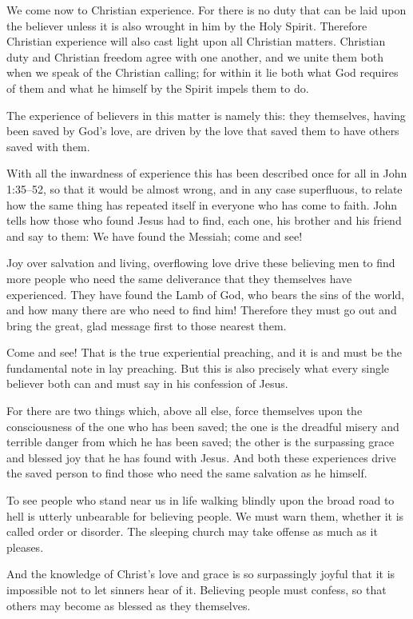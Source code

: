 We come now to Christian experience. For there is no duty that can be laid upon the believer unless it is also wrought in him by the Holy Spirit. Therefore Christian experience will also cast light upon all Christian matters. Christian duty and Christian freedom agree with one another, and we unite them both when we speak of the Christian calling; for within it lie both what God requires of them and what he himself by the Spirit impels them to do.

The experience of believers in this matter is namely this: they themselves, having been saved by God’s love, are driven by the love that saved them to have others saved with them.

With all the inwardness of experience this has been described once for all in John 1:35–52, so that it would be almost wrong, and in any case superfluous, to relate how the same thing has repeated itself in everyone who has come to faith. John tells how those who found Jesus had to find, each one, his brother and his friend and say to them: We have found the Messiah; come and see!

Joy over salvation and living, overflowing love drive these believing men to find more people who need the same deliverance that they themselves have experienced. They have found the Lamb of God, who bears the sins of the world, and how many there are who need to find him! Therefore they must go out and bring the great, glad message first to those nearest them.

Come and see! That is the true experiential preaching, and it is and must be the fundamental note in lay preaching. But this is also precisely what every single believer both can and must say in his confession of Jesus.

For there are two things which, above all else, force themselves upon the consciousness of the one who has been saved; the one is the dreadful misery and terrible danger from which he has been saved; the other is the surpassing grace and blessed joy that he has found with Jesus. And both these experiences drive the saved person to find those who need the same salvation as he himself.

To see people who stand near us in life walking blindly upon the broad road to hell is utterly unbearable for believing people. We must warn them, whether it is called order or disorder. The sleeping church may take offense as much as it pleases.

And the knowledge of Christ’s love and grace is so surpassingly joyful that it is impossible not to let sinners hear of it. Believing people must confess, so that others may become as blessed as they themselves.

